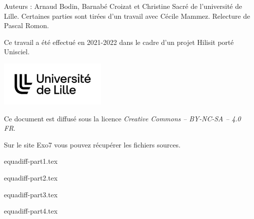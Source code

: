 \documentclass[11pt,a4paper]{report}
\begin{document}
\vfill

\begin{center}
\begin{minipage}{0.8\textwidth}
\center
Auteurs : Arnaud Bodin, Barnabé Croizat et Christine Sacré de l'université de Lille.
Certaines parties sont tirées d'un travail avec Cécile Mammez. Relecture de Pascal Romon.

  \medskip
  
Ce travail a été effectué en 2021-2022 dans le cadre d'un projet Hilisit porté  Unisciel.
\end{minipage}

  \medskip

\qquad\qquad
\includegraphics[height=2.2cm]{logo-ulille}

  \medskip
  
Ce document est diffusé sous la licence \emph{Creative Commons -- BY-NC-SA -- 4.0 FR}.


Sur le site Exo7 vous pouvez récupérer les fichiers sources.

\vspace*{0cm}

\end{center}


\newpage



{equadiff-part1.tex}
\newpage

{equadiff-part2.tex}
\newpage

{equadiff-part3.tex}
\newpage

{equadiff-part4.tex}
\newpage


\end{document}
